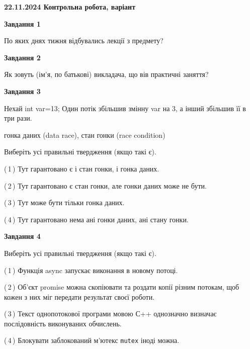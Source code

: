 \documentclass[12pt, ukrainian]{article}
\def\code#1{\Verb!#1!}
\begin{document}
\begin {large}

\textbf{22.11.2024 Контрольна робота, варіант  }\par


{

\begin{center}
\textbf{Завдання 1}
\end{center}

По яких днях тижня відбувались лекції з предмету?


\begin{center}
\textbf{Завдання 2}
\end{center}

Як зовуть (ім'я, по батькові) викладача, що вів практичні заняття?


\begin{center}
\textbf{Завдання 3}
\end{center}

Нехай int var=13; Один потік збільшив змінну var на 3, а інший збільшив її в три рази.

гонка даних (data race), стан гонки (race condition)

Виберіть усі правильні твердження (якщо такі є).\par
\vspace{2mm}
(\,1\,) Тут гарантовано є і стан гонки, і гонка даних.%

(\,2\,) Тут гарантовано є стан гонки, але гонки даних може не бути.%

(\,3\,) Тут може бути тільки гонка даних.%

(\,4\,) Тут гарантовано нема ані гонки даних, ані стану гонки.%


\begin{center}
\textbf{Завдання 4}
\end{center}

Виберіть усі правильні твердження (якщо такі є).\par
\vspace{2mm}

(\,1\,) Функція async запускає виконання в новому потоці.%

(\,2\,) Об’єкт promise можна скопіювати та роздати копії різним потокам, щоб кожен з них міг передати результат своєї роботи.%

(\,3\,) Текст однопотокової програми мовою С++ однозначно визначає послідовність виконуваних обчислень.%

(\,4\,) Блокувати заблокований м’ютекс  \code{mutex} іноді можна.%


}
\end{large}
\end{document}
